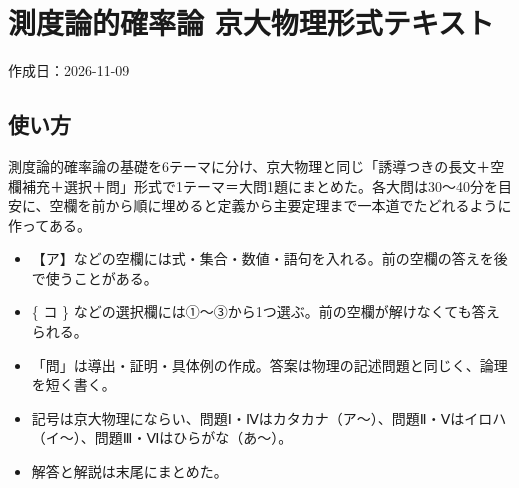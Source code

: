 \documentclass[
  10pt,
  a4paper,
]{article}
\author{}
\date{}
\providecommand{\tightlist}{%
  \setlength{\itemsep}{0pt}\setlength{\parskip}{0pt}}
\begin{document}
\hypertarget{ux6e2cux5ea6ux8ad6ux7684ux78baux7387ux8ad6-ux4eacux5927ux7269ux7406ux5f62ux5f0fux30c6ux30adux30b9ux30c8}{%
\section{測度論的確率論
京大物理形式テキスト}\label{ux6e2cux5ea6ux8ad6ux7684ux78baux7387ux8ad6-ux4eacux5927ux7269ux7406ux5f62ux5f0fux30c6ux30adux30b9ux30c8}}

作成日：2026-11-09

\hypertarget{ux4f7fux3044ux65b9}{%
\subsection{使い方}\label{ux4f7fux3044ux65b9}}

測度論的確率論の基礎を6テーマに分け、京大物理と同じ「誘導つきの長文＋空欄補充＋選択＋問」形式で1テーマ＝大問1題にまとめた。各大問は30〜40分を目安に、空欄を前から順に埋めると定義から主要定理まで一本道でたどれるように作ってある。

\begin{itemize}
\tightlist
\item
  【ア】などの空欄には式・集合・数値・語句を入れる。前の空欄の答えを後で使うことがある。
\item
  \{ コ \}
  などの選択欄には①〜③から1つ選ぶ。前の空欄が解けなくても答えられる。
\item
  「問」は導出・証明・具体例の作成。答案は物理の記述問題と同じく、論理を短く書く。
\item
  記号は京大物理にならい、問題Ⅰ・Ⅳはカタカナ（ア〜）、問題Ⅱ・Ⅴはイロハ（イ〜）、問題Ⅲ・Ⅵはひらがな（あ〜）。
\item
  解答と解説は末尾にまとめた。
\end{itemize}
\end{document}
